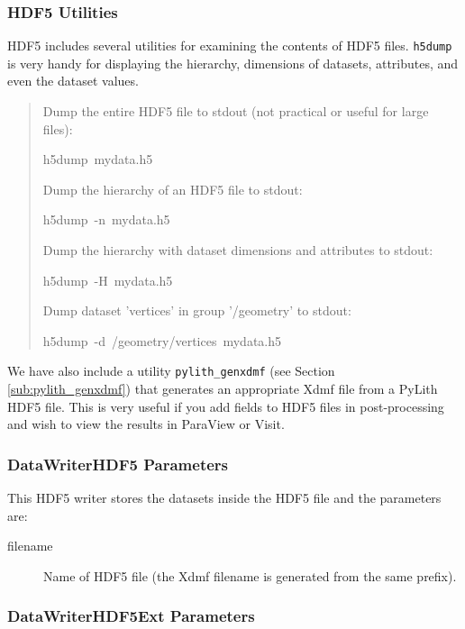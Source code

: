 \subsubsection{HDF5 Utilities}

HDF5 includes several utilities for examining the contents of HDF5
files. \texttt{h5dump} is very handy for displaying the hierarchy,
dimensions of datasets, attributes, and even the dataset values. 
\begin{quote}
Dump the entire HDF5 file to stdout (not practical or useful for large
files):
\begin{lyxcode}
h5dump~mydata.h5
\end{lyxcode}
Dump the hierarchy of an HDF5 file to stdout:
\begin{lyxcode}
h5dump~-n~mydata.h5
\end{lyxcode}
Dump the hierarchy with dataset dimensions and attributes to stdout:
\begin{lyxcode}
h5dump~-H~mydata.h5
\end{lyxcode}
Dump dataset 'vertices' in group '/geometry' to stdout:
\begin{lyxcode}
h5dump~-d~/geometry/vertices~mydata.h5
\end{lyxcode}
\end{quote}
We have also include a utility \texttt{pylith\_genxdmf} (see Section
\ref{sub:pylith_genxdmf}) that generates an appropriate Xdmf file
from a PyLith HDF5 file. This is very useful if you add fields to
HDF5 files in post-processing and wish to view the results in ParaView
or Visit.


\subsubsection{DataWriterHDF5 Parameters}

This HDF5 writer stores the datasets inside the HDF5 file and the
parameters are:
\begin{description}
\item [{filename}] Name of HDF5 file (the Xdmf filename is generated from
the same prefix).
\end{description}

\subsubsection{DataWriterHDF5Ext Parameters}

